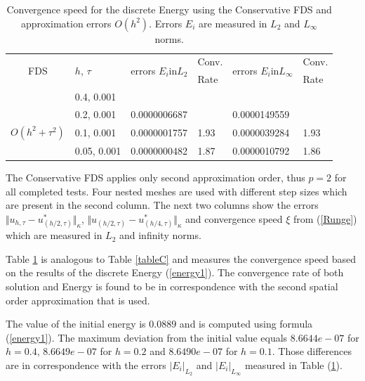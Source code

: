 \documentclass[%
 aip,
cp,  
 amsmath,amssymb,
 reprint,
]{iopconfser}
\newcommand{\rf}[1]{(\ref{#1})}
\begin{document}
\begin{table}[ht]
\centering
\small
		\begin{tabular}{||c|l|ll|ll||}
			\hline
			\hline
      \multirow{2  }{*}{FDS}        & \multirow{2  }{*}{$h$, $\tau$}  & \multirow{2  }{*}{errors $E_i$in$L_2$}  &Conv.& \multirow{2  }{*}{errors $E_i$in$L_\infty$}  &Conv.  \\
	                                        &                                                     &                                                                 &  Rate &                                                                       & Rate \\
   			\hline 
					\hline 
                                   &0.4, 0.001         &                    &                &                  &                   \\
                                   &0.2, 0.001        & 0.0000006687  &                & 0.0000149559   &                   \\
     $O(h^2 + \tau^ 2)$ &0.1, 0.001      & 0.0000001757   & 1.93       & 0.0000039284 & 1.93   \\
                                     &0.05, 0.001  & 0.0000000482   & 1.87       & 0.0000010792  & 1.86   \\
	   \hline
			\hline 
		\end{tabular}
		\caption{ Convergence speed for the discrete Energy using the Conservative FDS and approximation errors $O(h^{2})$. Errors $E_i$ are measured in $L_2$ and $L_\infty$ norms. }
\label{tableD}
\end{table}
The Conservative FDS applies only second approximation order, thus $p=2$ for all completed tests. Four nested meshes are used with different step sizes which are present in the second column. The next two columns show the errors $\Vert u_{h,\tau} - u^*_{(h/2,\tau)} \Vert_\kappa$, $\Vert  u_{(h/2,\tau)} - u^*_{(h/4,\tau)} \Vert_\kappa$ and convergence speed $\xi$ from \rf{Runge} which are measured in $L_2$ and infinity norms. 

Table \ref{tableD} is analogous to Table \ref{tableC} and measures the convergence speed based on the results of the discrete Energy \rf{energy1}. The convergence rate of both solution and Energy is found to be in correspondence with the second spatial order approximation that is used.

The value of the initial energy is $0.0889$ and is computed using formula \rf{energy1}. The maximum deviation from the initial value equals $8.6644e-07$ for $h=0.4$, $8.6649e-07$ for $h=0.2$ and $8.6490e-07$ for $h=0.1$. Those differences are in correspondence with the errors $|E_i|_{L_2}$ and $|E_i|_{L_\infty}$ measured in Table \rf{tableD}.
\end{document}
